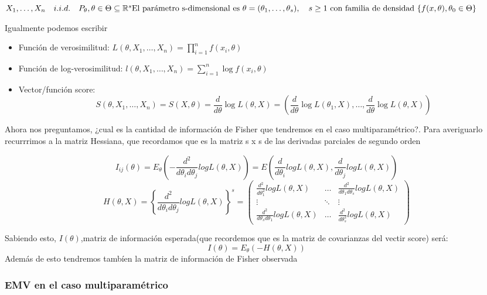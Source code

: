\(
X_1,\dots,X_n \quad i.i.d. \quad P_\theta,\theta \in \Theta \subseteq \mathbb{R}^s  \text{El parámetro s-dimensional es } \theta = (\theta_1,\dots,\theta_s), \\ \quad s \geq 1
 \text{ con familia de densidad }\{ f(x,\theta),\theta_0 \in \Theta\}
\)

Igualmente podemos escribir

\begin{itemize}
    \item Función de verosimilitud: $L(\theta,X_1,\dots,X_n)=\prod^{n}_{i=1} f(x_i,\theta)$
    \item Función de log-verosimilitud: $l(\theta,X_1,\dots,X_n)=\sum^{n}_{i=1} \log f(x_i,\theta)$
    \item Vector/función score: $$S(\theta,X_1,\dots,X_n)=S(X,\theta)=\frac{d}{d \theta} \log L(\theta,X)
    = \left(\frac{d}{d \theta} \log L(\theta_1,X),\dots,\frac{d}{d \theta} \log L(\theta,X)\right)$$
\end{itemize}

Ahora nos preguntamos, ¿cual es la cantidad de información de Fisher que tendremos en el caso multiparamétrico?.
Para averiguarlo recurrrimos a la matriz Hessiana, que recordamos que es la matriz s x s de las derivadas parciales de segundo orden

\[
I_{ij}(\theta)=E_\theta\left(-\frac{d^2}{d \theta_i d \theta_j} log L(\theta,X)\right)
=E(\frac{d}{d \theta_i} log L(\theta,X),\frac{d}{d \theta_j} log L(\theta,X))
\]
\[
H(\theta,X)=\left\{ \frac{d^2}{d \theta_i d \theta_j}log L(\theta,X) \right\}^s 
=
\begin{pmatrix}
    \frac{d^2}{d \theta_1^2}log L(\theta,X) & \dots & \frac{d^2}{d \theta_1 d \theta_s}log L(\theta,X) \\
    \vdots & \ddots & \vdots \\
    \frac{d^2}{d \theta_s d \theta_1}log L(\theta,X) & \dots & \frac{d^2}{d \theta_s^2}log L(\theta,X)
\end{pmatrix}
\]

Sabiendo esto, $I(\theta)$,matriz de información esperada(que recordemos que es la matriz de covarianzas del vectir score) será:
\[
I(\theta) = E_\theta(-H(\theta,X))
\]
Además de esto tendremos tambíen la matriz de información de Fisher observada

\subsubsection{EMV en el caso multiparamétrico}

